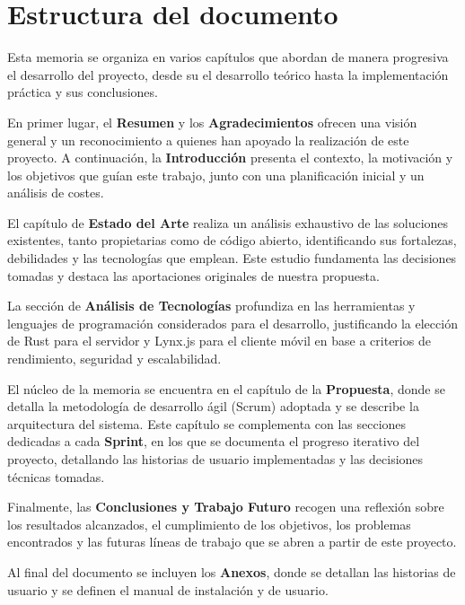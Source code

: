 \section{Estructura del documento}
Esta memoria se organiza en varios capítulos que abordan de manera progresiva el desarrollo del proyecto, desde su el desarrollo teórico hasta la implementación práctica y sus conclusiones.

En primer lugar, el \textbf{Resumen} y los \textbf{Agradecimientos} ofrecen una visión general y un reconocimiento a quienes han apoyado la realización de este proyecto. A continuación, la \textbf{Introducción} presenta el contexto, la motivación y los objetivos que guían este trabajo, junto con una planificación inicial y un análisis de costes.

El capítulo de \textbf{Estado del Arte} realiza un análisis exhaustivo de las soluciones existentes, tanto propietarias como de código abierto, identificando sus fortalezas, debilidades y las tecnologías que emplean. Este estudio fundamenta las decisiones tomadas y destaca las aportaciones originales de nuestra propuesta.

La sección de \textbf{Análisis de Tecnologías} profundiza en las herramientas y lenguajes de programación considerados para el desarrollo, justificando la elección de Rust para el servidor y Lynx.js para el cliente móvil en base a criterios de rendimiento, seguridad y escalabilidad.

El núcleo de la memoria se encuentra en el capítulo de la \textbf{Propuesta}, donde se detalla la metodología de desarrollo ágil (Scrum) adoptada y se describe la arquitectura del sistema. Este capítulo se complementa con las secciones dedicadas a cada \textbf{Sprint}, en los que se documenta el progreso iterativo del proyecto, detallando las historias de usuario implementadas y las decisiones técnicas tomadas.

Finalmente, las \textbf{Conclusiones y Trabajo Futuro} recogen una reflexión sobre los resultados alcanzados, el cumplimiento de los objetivos, los problemas encontrados y las futuras líneas de trabajo que se abren a partir de este proyecto.

Al final del documento se incluyen los \textbf{Anexos}, donde se detallan las historias de usuario y se definen el manual de instalación y de usuario.
